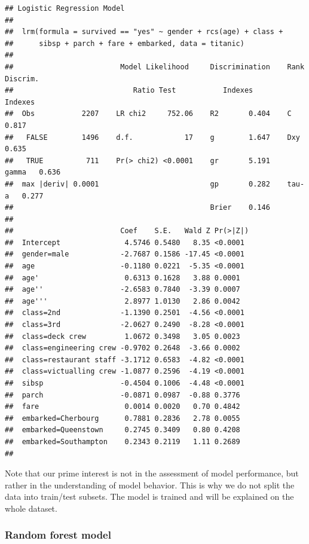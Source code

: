 \documentclass[12pt,]{krantz}
\begin{document}
\begin{verbatim}
## Logistic Regression Model
##  
##  lrm(formula = survived == "yes" ~ gender + rcs(age) + class + 
##      sibsp + parch + fare + embarked, data = titanic)
##  
##                         Model Likelihood     Discrimination    Rank Discrim.    
##                            Ratio Test           Indexes           Indexes       
##  Obs           2207    LR chi2     752.06    R2       0.404    C       0.817    
##   FALSE        1496    d.f.            17    g        1.647    Dxy     0.635    
##   TRUE          711    Pr(> chi2) <0.0001    gr       5.191    gamma   0.636    
##  max |deriv| 0.0001                          gp       0.282    tau-a   0.277    
##                                              Brier    0.146                     
##  
##                         Coef    S.E.   Wald Z Pr(>|Z|)
##  Intercept               4.5746 0.5480   8.35 <0.0001 
##  gender=male            -2.7687 0.1586 -17.45 <0.0001 
##  age                    -0.1180 0.0221  -5.35 <0.0001 
##  age'                    0.6313 0.1628   3.88 0.0001  
##  age''                  -2.6583 0.7840  -3.39 0.0007  
##  age'''                  2.8977 1.0130   2.86 0.0042  
##  class=2nd              -1.1390 0.2501  -4.56 <0.0001 
##  class=3rd              -2.0627 0.2490  -8.28 <0.0001 
##  class=deck crew         1.0672 0.3498   3.05 0.0023  
##  class=engineering crew -0.9702 0.2648  -3.66 0.0002  
##  class=restaurant staff -3.1712 0.6583  -4.82 <0.0001 
##  class=victualling crew -1.0877 0.2596  -4.19 <0.0001 
##  sibsp                  -0.4504 0.1006  -4.48 <0.0001 
##  parch                  -0.0871 0.0987  -0.88 0.3776  
##  fare                    0.0014 0.0020   0.70 0.4842  
##  embarked=Cherbourg      0.7881 0.2836   2.78 0.0055  
##  embarked=Queenstown     0.2745 0.3409   0.80 0.4208  
##  embarked=Southampton    0.2343 0.2119   1.11 0.2689  
## 
\end{verbatim}

Note that our prime interest is not in the assessment of model performance, but rather in the understanding of model behavior. This is why we do not split the data into train/test subsets. The model is trained and will be explained on the whole dataset.

\hypertarget{model-titanic-rf}{%
\subsubsection{Random forest model}\label{model-titanic-rf}}
\end{document}
